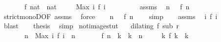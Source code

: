 \begin{isabellebody}
\ \ \ \ \ \ \ {\isacartoucheopen}f\ {\isacharparenleft}{}{\isacharcolon}{\isacharcolon}nat{\isacharparenright}\ {\isacharequal}\ {\isacharparenleft}{}{\isacharcolon}{\isacharcolon}nat{\isacharparenright}{\isacartoucheclose}\isanewline
\ \ \ \ \ {\isacartoucheopen}Max\ {\isacharbraceleft}i{\isachardot}\ f\ i\ {\isasymle}\ {}{\isacharbraceright}\ {\isacharequal}\ {}{\isacartoucheclose}\isanewline
%
\isadelimproof
%
\endisadelimproof
%
\isatagproof
{}\isamarkupfalse%
\ {\isacharminus}\isanewline
\ \ \isamarkupfalse%
\ assms{\isacharparenleft}{}{\isacharparenright}\ \isamarkupfalse%
\ {\isacartoucheopen}{\isasymforall}n\ {\isachargreater}\ {}{\isachardot}\ f\ n\ {\isachargreater}\ {}{\isacartoucheclose}\ \isamarkupfalse%
\ strict{\isacharunderscore}monoD{\isacharbrackleft}OF\ assms{\isacharparenleft}{}{\isacharparenright}{\isacharbrackright}\ \isamarkupfalse%
\ force\isanewline
\ \ \isamarkupfalse%
\ {\isacartoucheopen}{\isasymforall}n\ {\isasymnoteq}\ {}{\isachardot}\ {\isasymnot}{\isacharparenleft}f\ n\ {\isasymle}\ {}{\isacharparenright}{\isacartoucheclose}\ \isamarkupfalse%
\ simp\isanewline
\ \ \isamarkupfalse%
\ assms{\isacharparenleft}{}{\isacharparenright}\ \isamarkupfalse%
\ {\isacartoucheopen}{\isacharbraceleft}i{\isachardot}\ f\ i\ {\isasymle}\ {}{\isacharbraceright}\ {\isacharequal}\ {\isacharbraceleft}{}{\isacharbraceright}{\isacartoucheclose}\ \isamarkupfalse%
\ blast\isanewline
\ \ \isamarkupfalse%
\ {\isacharquery}thesis\ \isamarkupfalse%
\ simp\isanewline
{}\isamarkupfalse%
%
\endisatagproof
{\isafoldproof}%
%
\isadelimproof
\isanewline
%
\endisadelimproof
\isanewline
{}\isamarkupfalse%
\ not{\isacharunderscore}image{\isacharunderscore}stut{\isacharcolon}\isanewline
\ \ \ {\isacartoucheopen}dilating\ f\ sub\ r{\isacartoucheclose}\isanewline
\ \ \ \ \ \ \ {\isacartoucheopen}n\ {\isacharequal}\ Max\ {\isacharbraceleft}i{\isachardot}\ f\ i\ {\isasymle}\ n{\isacharbraceright}{\isacartoucheclose}\isanewline
\ \ \ \ \ \ \ {\isacartoucheopen}f\ n\ {\isacharless}\ k\ {\isasymand}\ k\ {\isasymle}\ n{\isacartoucheclose}\isanewline
\ \ \ \ \ {\isacartoucheopen}{\isasymnexists}k\ f\ k\ {\isacharequal}\ k{\isacartoucheclose}\isanewline

\end{isabellebody}
